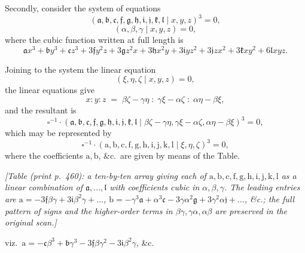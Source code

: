 \documentclass[11pt]{article}
\begin{document}
\medskip

\noindent Secondly, consider the system of equations
\[
(\mathfrak{a}, \mathfrak{b}, \mathfrak{c}, \mathfrak{f}, \mathfrak{g}, \mathfrak{h}, \mathfrak{i}, \mathfrak{j}, \mathfrak{k}, \mathfrak{l} \mid x, y, z)^3 = 0,
\]
\[
(\alpha, \beta, \gamma \mid x, y, z) = 0,
\]
where the cubic function written at full length is
\[
\mathfrak{a} x^3 + \mathfrak{b} y^3 + \mathfrak{c} z^3 + 3\mathfrak{f} y^2 z + 3\mathfrak{g} z^2 x + 3\mathfrak{h} x^2 y + 3\mathfrak{i} y z^2 + 3\mathfrak{j} z x^2 + 3\mathfrak{k} x y^2 + 6\mathfrak{l} x y z.
\]

\medskip

\noindent Joining to the system the linear equation
\[
(\xi, \eta, \zeta \mid x, y, z) = 0,
\]
the linear equations give
\[
x : y : z \;=\; \beta\zeta - \gamma\eta \;:\; \gamma\xi - \alpha\zeta \;:\; \alpha\eta - \beta\xi,
\]
and the resultant is
\[
\square^{-1}\cdot (\mathfrak{a}, \mathfrak{b}, \mathfrak{c}, \mathfrak{f}, \mathfrak{g}, \mathfrak{h}, \mathfrak{i}, \mathfrak{j}, \mathfrak{k}, \mathfrak{l} \mid \beta\zeta - \gamma\eta, \gamma\xi - \alpha\zeta, \alpha\eta - \beta\xi)^3 = 0,
\]
which may be represented by
\[
\square^{-1} \cdot (\mathrm{a}, \mathrm{b}, \mathrm{c}, \mathrm{f}, \mathrm{g}, \mathrm{h}, \mathrm{i}, \mathrm{j}, \mathrm{k}, \mathrm{l} \mid \xi, \eta, \zeta)^3 = 0,
\]
where the coefficients $\mathrm{a}, \mathrm{b}$, \&c.\ are given by means of the Table.

\medskip

\noindent\textit{[Table (print p.~460): a ten-by-ten array giving each of $\mathrm{a}, \mathrm{b}, \mathrm{c}, \mathrm{f}, \mathrm{g}, \mathrm{h}, \mathrm{i}, \mathrm{j}, \mathrm{k}, \mathrm{l}$ as a linear combination of $\mathfrak{a}, \ldots, \mathfrak{l}$ with coefficients cubic in $\alpha, \beta, \gamma$. The leading entries are $\mathrm{a} = -3\mathfrak{f}\beta\gamma + 3\mathfrak{i}\beta^2\gamma + \ldots$, $\mathrm{b} = -\gamma^3\mathfrak{a} + \alpha^3\mathfrak{c} - 3\gamma\alpha^2\mathfrak{g} + 3\gamma^2\alpha\mathfrak{j} + \ldots$, \&c.; the full pattern of signs and the higher-order terms in $\beta\gamma, \gamma\alpha, \alpha\beta$ are preserved in the original scan.]}

\medskip

\noindent viz.\ $\mathrm{a} = -\mathfrak{c}\beta^3 + \mathfrak{b}\gamma^3 - 3\mathfrak{f}\beta\gamma^2 - 3\mathfrak{i}\beta^2\gamma$, \&c.

\medskip
\end{document}
